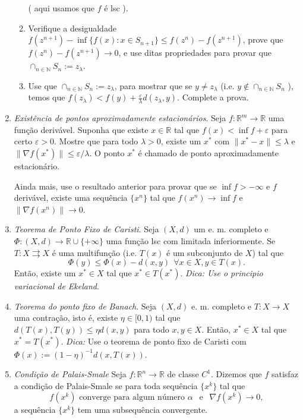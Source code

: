 \documentclass[a4paper,latin]{article}
\begin{document}
\begin{enumerate}
\begin{enumerate}
           ( aqui usamos que $f$ é lsc ).
          \item Verifique a desigualdade 
          $f(z^{n+1})-\inf \{f(x):x \in S_{n+1}\}
          \leq f(z^{n})-f(z^{n+1})$, prove que 
          $f(z^n)-f(z^{n+1}) \rightarrow 0$, e use ditas
          propriedades para provar que $\cap_{n \in \mathbb{N}} S_{n}:=z_{\lambda}$. 
          \item Use que $\cap_{n \in \mathbb{N}} S_{n}:=z_{\lambda}$, para mostrar que se $y \neq z_{\lambda}$ (i.e.
           $y \notin \cap_{n \in \mathbb{N}} S_{n}$ ), 
           temos que 
          $f(z_{\lambda})<
       f(y)+\frac{\varepsilon}{\lambda}d(z_{\lambda},y)$.
       Complete a prova.
          \end{enumerate}              
    \item {\it Existência de pontos aproximadamente estacionários}.
    Seja $f:\mathbb{R}^m \rightarrow \mathbb{R}$ uma função derivável.
    Suponha que existe $x \in \mathbb{R}$
    tal que $f(x)<\inf f +\varepsilon$
    para certo $\varepsilon>0$.
    Mostre que para todo $\lambda>0$, existe um $x^*$ com $\|x^*-x\|\leq \lambda$
    e $\|\nabla f(x^*)\|\leq \varepsilon/\lambda$. O ponto $x^*$ 
    é chamado de ponto aproximadamente estacionário. 
    
    Ainda mais, use o resultado anterior para provar que se $\inf f>-\infty$ e $f$ derivável, existe uma sequência 
    $\{x^n\}$ tal que 
    $f(x^{n})\rightarrow \inf f$
    e 
    $\|\nabla f(x^n)\| \rightarrow 0$.      
    \item {\it Teorema de Ponto Fixo de Caristi}.
    Seja $(X,d)$ um e. m. completo e 
    $\Phi:(X,d)\rightarrow \mathbb{R}\cup \{+\infty\}$
    uma função lsc com limitada inferiormente.
    Se $T: X \rightrightarrows X$ é uma multifunção 
    (i.e. $T(x)$ é um subconjunto de $X$) tal que 
    $$  \Phi(y)\leq \Phi(x)-d(x,y)\ \ \forall x \in X, y \in T(x).$$
    Então, existe um $x^{*} \in X$ tal que $x^* \in T(x^*)$. {\it Dica: Use o principio variacional de Ekeland}.
    \item {\it Teorema do ponto fixo de Banach}.
    Seja $(X,d)$ e. m. completo e $T:X \rightarrow X$
    uma contração, isto é, existe $\eta \in [0,1)$
    tal que $d(T(x),T(y))\leq \eta d(x,y)$ para todo 
    $x, y \in X$. 
    Então, $x^{*} \in X$ tal que $x^*=T(x^*)$.
    {\it Dica:} Use o teorema de ponto fixo de Caristi com 
    $\Phi(x):=(1-\eta)^{-1}d(x,T(x))$.
    \item {\it Condição de Palais-Smale }
    Seja  $f:\mathbb{R}^{n} \rightarrow 
    \mathbb{R}$ de classe $C^{1}$.
    Dizemos que $f$ satisfaz a condição de Palais-Smale  se para toda sequência $\{x^{k}\}$ tal que 
    $$  
        f(x^k) \text{ converge para algum número } \alpha 
        \ \ \text{ e } \ \  
        \nabla f(x^k)\rightarrow 0, $$
    a sequência $\{x^{k}\}$ tem uma subsequência convergente.
    

\end{enumerate}
\end{document}
